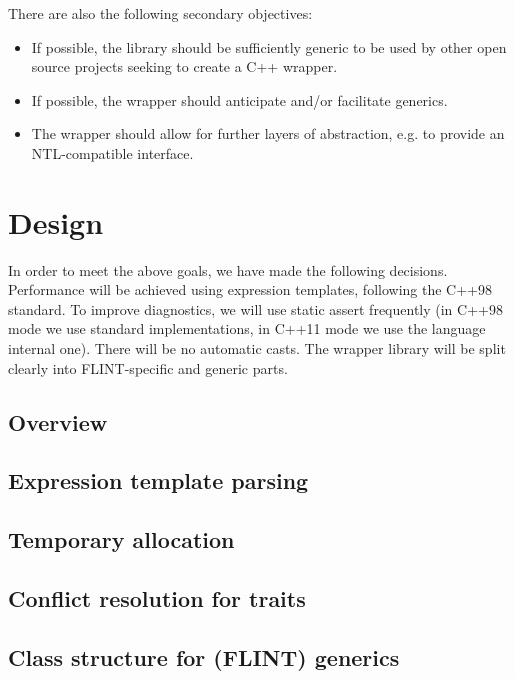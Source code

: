 \documentclass{scrartcl}
\begin{document}
There are also the following secondary objectives:

\begin{itemize}
\item If possible, the library should be sufficiently generic to be used by
    other open source projects seeking to create a C++ wrapper.
\item If possible, the wrapper should anticipate and/or facilitate
    generics.
\item The wrapper should allow for further layers of abstraction, e.g. to
    provide an NTL-compatible interface.
\end{itemize}


\section*{Design}

In order to meet the above goals, we have made the following decisions.
Performance will be achieved using expression templates, following the
C++98 standard. To improve diagnostics, we will use static assert
frequently (in C++98 mode we use standard implementations, in C++11 mode we
use the language internal one). There will be no automatic casts. The
wrapper library will be split clearly into FLINT-specific and generic
parts.

\subsection*{Overview}

\subsection*{Expression template parsing}

\subsection*{Temporary allocation}

\subsection*{Conflict resolution for traits}

\subsection*{Class structure for (FLINT) generics}
\end{document}
